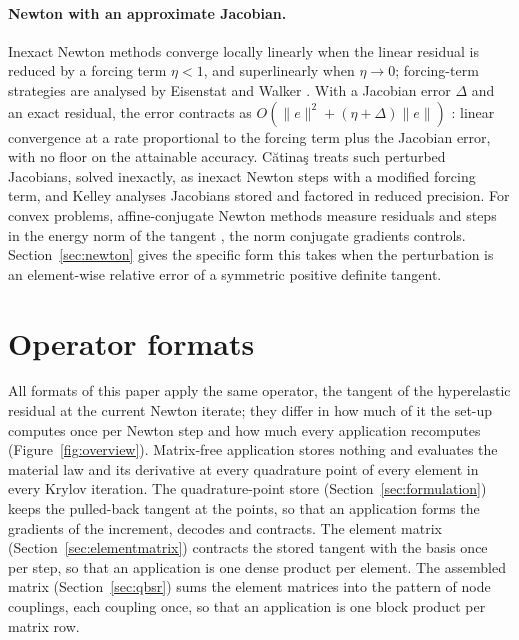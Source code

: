 \documentclass[sigconf,balance=false]{acmart}
\begin{document}
\paragraph{Newton with an approximate Jacobian.}  Inexact Newton methods
\cite{DemboEisenstatSteihaug1982} converge locally linearly when the linear residual is reduced by
a forcing term $\eta<1$, and superlinearly when $\eta\to0$; forcing-term strategies are analysed by
Eisenstat and Walker \cite{EisenstatWalker1996}.  With a Jacobian error $\Delta$ and an exact
residual, the error contracts as $O(\|e\|^2 + (\eta+\Delta)\|e\|)$ \cite{Kelley2018}: linear
convergence at a rate proportional to the forcing term plus the Jacobian error, with no floor on
the attainable accuracy.  C\u{a}tina\c{s} \cite{Catinas2001} treats such perturbed Jacobians, solved
inexactly, as inexact Newton steps with a modified forcing term, and Kelley \cite{Kelley2022}
analyses Jacobians stored and factored in reduced precision.  For convex problems, affine-conjugate
Newton methods measure residuals and steps in the energy norm of the tangent
\cite{Deuflhard2004}, the norm conjugate gradients controls.  Section~\ref{sec:newton} gives the specific form
this takes when the perturbation is an element-wise relative error of a symmetric positive
definite tangent.

\section{Operator formats}
\label{sec:overview}

All formats of this paper apply the same operator, the tangent of the hyperelastic residual at the
current Newton iterate; they differ in how much of it the set-up computes once per Newton step and
how much every application recomputes (Figure~\ref{fig:overview}).  Matrix-free application stores
nothing and evaluates the material law and its derivative at every quadrature point of every element
in every Krylov iteration.  The quadrature-point store (Section~\ref{sec:formulation}) keeps the
pulled-back tangent at the points, so that an application forms the gradients of the increment,
decodes and contracts.  The element matrix (Section~\ref{sec:elementmatrix}) contracts the stored
tangent with the basis once per step, so that an application is one dense product per element.  The
assembled matrix (Section~\ref{sec:qbsr}) sums the element matrices into the pattern of node
couplings, each coupling once, so that an application is one block product per matrix row.
\end{document}
